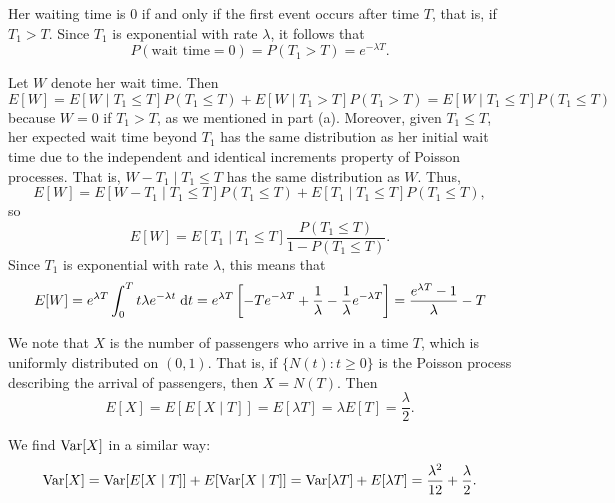 \documentclass{homework}
\begin{document}
	\begin{alphaparts}
		\questionpart Her waiting time is 0 if and only if the first event occurs after time $T$, that is, if $T_1 > T$. Since $T_1$ is exponential with rate $\lambda$, it follows that
		\begin{equation*}
			P(\text{wait time} = 0) = P(T_1 > T) = e^{-\lambda T}.
		\end{equation*}
		
		\questionpart Let $W$ denote her wait time. Then
		\begin{equation*}
			E[W] = E[W \mid T_1 \le T]P(T_1 \le T) + E[W \mid T_1 > T]P(T_1 > T) = E[W \mid T_1 \le T]P(T_1 \le T)
		\end{equation*}
		because $W = 0$ if $T_1 > T$, as we mentioned in part (a). Moreover, given $T_1 \le T$, her expected wait time beyond $T_1$ has the same distribution as her initial wait time due to the independent and identical increments property of Poisson processes. That is, $W - T_1 \mid T_1 \le T$ has the same distribution as $W$. Thus,
		\begin{equation*}
			E[W] = E[W - T_1 \mid T_1 \le T]P(T_1 \le T) + E[T_1 \mid T_1 \le T]P(T_1\le T),
		\end{equation*}
		so
		\begin{equation*}
			E[W] = E[T_1 \mid T_1 \le T]\frac{P(T_1\le T)}{1 - P(T_1 \le T)}.
		\end{equation*}
		Since $T_1$ is exponential with rate $\lambda$, this means that
		\begin{equation*}
			E[W] = e^{\lambda T}\int_0^T t\lambda e^{-\lambda t}\;\text{d} t = e^{\lambda T}\left[-Te^{-\lambda T} +\frac{1}{\lambda} - \frac{1}{\lambda}e^{-\lambda T}\right] = \frac{e^{\lambda T}-1}{\lambda} - T
		\end{equation*}
	\end{alphaparts}
	
	\question*{Textbook: 50, p. 372}
	\begin{alphaparts}
		\questionpart We note that $X$ is the number of passengers who arrive in a time $T$, which is uniformly distributed on $(0,1)$. That is, if $\{N(t) : t \ge 0\}$ is the Poisson process describing the arrival of passengers, then $X = N(T)$. Then
		\begin{equation*}
			E[X] = E[E[X \mid T]] = E[\lambda T] = \lambda E[T] = \frac{\lambda}{2}.
		\end{equation*}
		
		\questionpart We find $\mathrm{Var}[X]$ in a similar way:
		\begin{equation*}
			\mathrm{Var}[X] = \mathrm{Var}[E[X \mid T]] + E[\mathrm{Var}[X \mid T]] = \mathrm{Var}[\lambda T] + E[\lambda T] = \frac{\lambda^2}{12} + \frac{\lambda}{2}.
		\end{equation*}
	\end{alphaparts}
\end{document}
